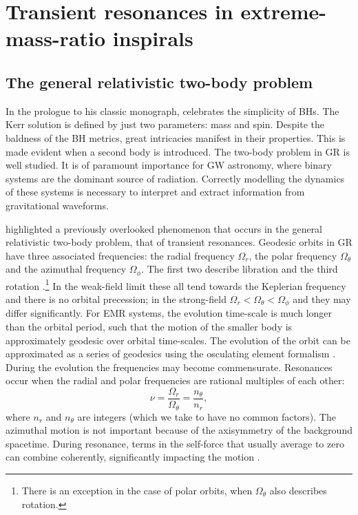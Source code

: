 \chapter{Transient resonances in extreme-mass-ratio inspirals}\label{ch:resonances}

\section{The general relativistic two-body problem}

In the prologue to his classic monograph, \citet{Chandrasekhar1992} celebrates the simplicity of BHs. The Kerr solution is defined by just two parameters: mass and spin. Despite the baldness of the BH metrics, great intricacies manifest in their properties. This is made evident when a second body is introduced. The two-body problem in GR is well studied. It is of paramount importance for GW astronomy, where binary systems are the dominant source of radiation. Correctly modelling the dynamics of these systems is necessary to interpret and extract information from gravitational waveforms.

\citet{Flanagan2012} highlighted a previously overlooked phenomenon that occurs in the general relativistic two-body problem, that of transient resonances. Geodesic orbits in GR have three associated frequencies: the radial frequency $\Omega_r$, the polar frequency $\Omega_\theta$ and the azimuthal frequency $\Omega_\phi$. The first two describe libration and the third rotation \citep[section 10.6]{Goldstein2002}.\footnote{There is an exception in the case of polar orbits, when $\Omega_\theta$ also describes rotation.} In the weak-field limit these all tend towards the Keplerian frequency and there is no orbital precession; in the strong-field $\Omega_r < \Omega_\theta < \Omega_\phi$ and they may differ significantly. For EMR systems, the evolution time-scale is much longer than the orbital period, such that the motion of the smaller body is approximately geodesic over orbital time-scales. The evolution of the orbit can be approximated as a series of geodesics using the osculating element formalism \citep{Pound2008,Gair2011a}. During the evolution the frequencies may become commensurate. Resonances occur when the radial and polar frequencies are rational multiples of each other:
\begin{equation}
\nu = \dfrac{\Omega_r}{\Omega_\theta} = \dfrac{n_\theta}{n_r},
\end{equation}
where $n_r$ and $n_\theta$ are integers (which we take to have no common factors). The azimuthal motion is not important because of the axisymmetry of the background spacetime. During resonance, terms in the self-force that usually average to zero can combine coherently, significantly impacting the motion \citep{Flanagan2012a}.

